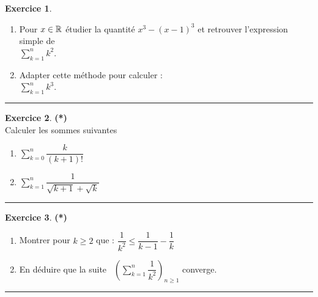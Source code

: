 \documentclass[a4paper,11pt]{article}
\theoremstyle{definition}
\newtheorem{exo}{Exercice} %
\begin{document}
\begin{minipage}[c]{1\linewidth}
\begin{minipage}[c]{0.48\linewidth}
\begin{exo}
			\begin{enumerate}
				\item Pour $x\in\mathbb{R}$ étudier la quantité $x^3-(x-1)^3$ et retrouver l'expression simple de\quad\\[0.25cm]
				
				\centering$ \displaystyle\sum\limits_{k=1}^{n}{k^2}$.
				
				\raggedright
				\item Adapter cette méthode pour calculer :\quad\\[0.25cm]
				
				\centering$ \displaystyle\sum\limits_{k=1}^{n}{k^3}$.
				
				
			\end{enumerate}
			
			
			\centering
			\rule{1\linewidth}{0.6pt}
		\end{exo}
		
			\begin{exo}\textbf{(*)}\quad\\[0.2cm]
			
			Calculer les sommes suivantes 
			\begin{enumerate}
				\item $ \displaystyle\sum\limits_{k=0}^{n}{\dfrac{k}{(k+1)!}}$
				\item $ \displaystyle\sum\limits_{k=1}^{n}{\dfrac{1}{\sqrt{k+1} + \sqrt{k}}}$ 
			\end{enumerate}
		
			
			\centering
			\rule{1\linewidth}{0.6pt}
		\end{exo}
	
	
	\begin{exo}\textbf{(*)}\quad\\[0.2cm]
	
		\begin{enumerate}
			\item  Montrer pour $k\geq2$ que : $\dfrac{1}{k^2}\leq \dfrac{1}{k-1}- \dfrac{1}{k}$
			 \item En déduire que la suite  \ $ \left(\displaystyle\sum\limits_{k=1}^{n}{\dfrac{1}{k^2}}\right)_{n\geq1}$ converge.
		\end{enumerate}
		
		
		\centering
		\rule{1\linewidth}{0.6pt}
	\end{exo}
		
		
	\end{minipage}	
	\hfill\vrule\hfill
	\begin{minipage}[c]{0.48\linewidth}
		\raggedright
		

\end{minipage}
\end{minipage}
\end{document}
